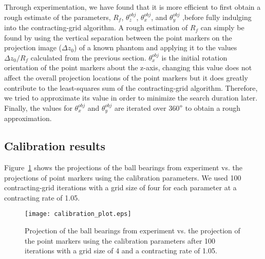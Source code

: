 Through experimentation, we have found that it is more efficient to first obtain a rough estimate of the parameters, $R_f$, $\theta^{obj}_z$, $\theta^{obj}_x$, and $\theta^{obj}_y$ ,before fully indulging into the contracting-grid algorithm.  A rough estimation of $R_f$ can simply be found by using the vertical separation between the point markers on the projection image ($\Delta z_0$) of a known phantom and applying it to the values $\Delta z_0/R_f$ calculated from the previous section.  $\theta^{obj}_x$ is the initial rotation orientation of the point markers about the z-axis, changing this value does not affect the overall projection locations of the point markers but it does greatly contribute to the least-squares sum of the contracting-grid algorithm.  Therefore, we tried to approximate its value in order to minimize the search duration later.  Finally, the values for $\theta_x^{obj}$ and $\theta_y^{obj}$ are iterated over 360$\degree$ to obtain a rough approximation.  

\subsection{Calibration results}
\label{subsect:cali_results}
Figure~\ref{fig:calibration_plot} shows the projections of the ball bearings from experiment vs. the projections of point markers using the calibration parameters.  We used 100 contracting-grid iterations with a grid size of four for each parameter at a contracting rate of 1.05.
%
\begin{figure}[h]
\texttt{[image: calibration\_plot.eps]}
\caption{Projection of the ball bearings from experiment vs. the projection of the point markers using the calibration parameters after 100 iterations with a grid size of 4 and a contracting rate of 1.05.}
\label{fig:calibration_plot}
\end{figure}

